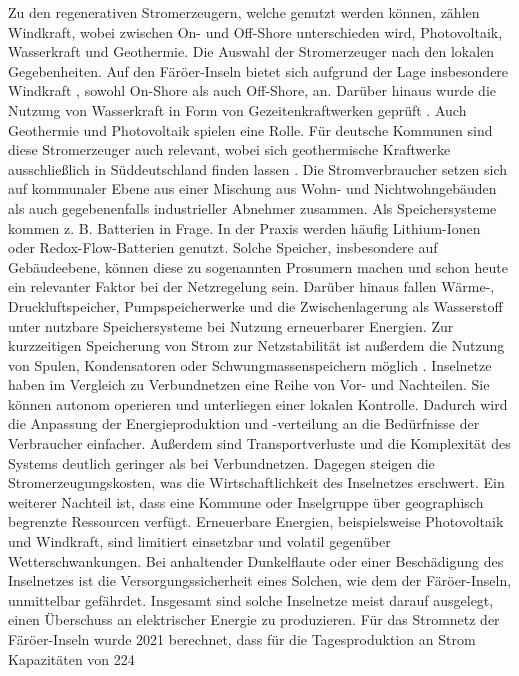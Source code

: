 
Zu den regenerativen Stromerzeugern, welche genutzt werden können, zählen Windkraft, wobei zwischen On- und Off-Shore unterschieden wird, Photovoltaik, Wasserkraft und Geothermie. Die Auswahl der Stromerzeuger nach den lokalen Gegebenheiten. Auf den Färöer-Inseln bietet sich aufgrund der Lage insbesondere Windkraft , sowohl On-Shore als auch Off-Shore, an. Darüber hinaus wurde die Nutzung von Wasserkraft in Form von Gezeitenkraftwerken geprüft . Auch Geothermie und Photovoltaik spielen eine Rolle. Für deutsche Kommunen sind diese Stromerzeuger auch relevant, wobei sich geothermische Kraftwerke ausschließlich in Süddeutschland finden lassen . Die Stromverbraucher setzen sich auf kommunaler Ebene aus einer Mischung aus Wohn- und Nichtwohngebäuden als auch gegebenenfalls industrieller Abnehmer zusammen. Als Speichersysteme kommen z. B. Batterien in Frage. In der Praxis werden häufig Lithium-Ionen oder Redox-Flow-Batterien genutzt. Solche Speicher, insbesondere auf Gebäudeebene, können diese zu sogenannten Prosumern  machen und schon heute ein relevanter Faktor bei der Netzregelung sein. Darüber hinaus fallen Wärme-, Druckluftspeicher, Pumpspeicherwerke und die Zwischenlagerung als Wasserstoff unter nutzbare Speichersysteme bei Nutzung erneuerbarer Energien. Zur kurzzeitigen Speicherung von Strom zur Netzstabilität ist außerdem die Nutzung von Spulen, Kondensatoren oder Schwungmassenspeichern möglich . 
Inselnetze haben im Vergleich zu Verbundnetzen eine Reihe von Vor- und Nachteilen. Sie können autonom operieren und unterliegen einer lokalen Kontrolle. Dadurch wird die Anpassung der Energieproduktion und -verteilung an die Bedürfnisse der Verbraucher einfacher. Außerdem sind Transportverluste und die Komplexität des Systems deutlich geringer als bei Verbundnetzen. Dagegen steigen die Stromerzeugungskosten, was die Wirtschaftlichkeit des Inselnetzes erschwert. Ein weiterer Nachteil ist, dass eine Kommune oder Inselgruppe über geographisch begrenzte Ressourcen verfügt. Erneuerbare Energien, beispielsweise Photovoltaik und Windkraft, sind limitiert einsetzbar und volatil gegenüber Wetterschwankungen. Bei anhaltender Dunkelflaute oder einer Beschädigung des Inselnetzes ist die Versorgungssicherheit eines Solchen, wie dem der Färöer-Inseln, unmittelbar gefährdet.
Insgesamt sind solche Inselnetze meist darauf ausgelegt, einen Überschuss an elektrischer Energie zu produzieren. Für das Stromnetz der Färöer-Inseln wurde 2021 berechnet, dass für die Tagesproduktion an Strom Kapazitäten von 224%
 
